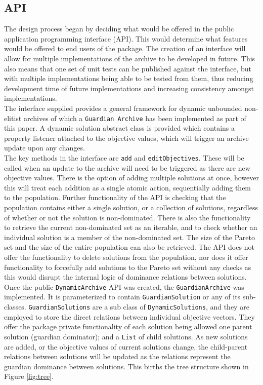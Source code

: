 \documentclass{ecmm427_assignment}
\begin{document}
\subsection{API}
The design process began by deciding what would be offered in the public application programming interface (API). This would determine what features would be offered to end users of the package. The creation of an interface will allow for multiple implementations of the archive to be developed in future. This also means that one set of unit tests can be published against the interface, but with multiple implementations being able to be tested from them, thus reducing development time of future implementations and increasing consistency amongst implementations.\\
The interface supplied provides a general framework for dynamic unbounded non-elitist archives of which a \texttt{Guardian Archive} has been implemented as part of this paper. A dynamic solution abstract class is provided which contains a property listener attached to the objective values, which will trigger an archive update upon any changes.\\
The key methods in the interface are \texttt{add} and \texttt{editObjectives}. These will be called when an update to the archive will need to be triggered as there are new objective values. There is the option of adding multiple solutions at once, however this will treat each addition as a single atomic action, sequentially adding them to the population. Further functionality of the API is checking that the population contains either a single solution, or a collection of solutions, regardless of whether or not the solution is non-dominated. There is also the functionality to retrieve the current non-dominated set as an iterable, and to check whether an individual solution is a member of the non-dominated set. The size of the Pareto set and the size of the entire population can also be retrieved. The API does not offer the functionality to delete solutions from the population, nor does it offer functionality to forcefully add solutions to the Pareto set without any checks as this would disrupt the internal logic of dominance relations between solutions.
\\Once the public \texttt{DynamicArchive} API was created, the \texttt{GuardianArchive} was implemented. It is parameterized to contain \texttt{GuardianSolution} or any of its sub-classes. \texttt{GuardianSolutions} are a sub class of \texttt{DynamicSolutions}, and they are employed to store the direct relations between individual objective vectors. They offer the package private functionality of each solution being allowed one parent solution (guardian dominator); and a \texttt{List} of child solutions. As new solutions are added, or the objective values of current solutions change, the child-parent relations between solutions will be updated as the relations represent the guardian dominance between solutions. This births the tree structure shown in Figure \ref{fig:tree}.
\end{document}
